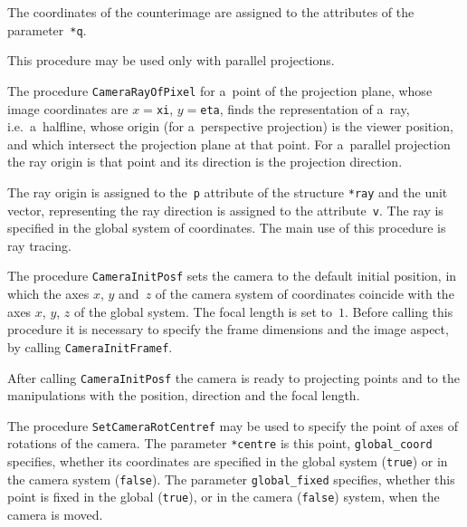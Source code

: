 The coordinates of the counterimage are assigned to the attributes of the
parameter~\texttt{*q}.

This procedure may be used only with parallel projections.

\vspace{\bigskipamount}
\begin{sloppypar}
The procedure \texttt{CameraRayOfPixel} for a~point of the projection plane,
whose image coordinates are $x={}$\texttt{xi}, $y={}$\texttt{eta}, finds
the representation of a~ray, i.e.\ a~halfline, whose origin (for
a~perspective projection) is the viewer position, and which intersect the
projection plane at that point. For a~parallel projection the ray origin is
that point and its direction is the projection direction.%
\end{sloppypar}

\begin{sloppypar}
The ray origin is assigned to the~\texttt{p} attribute of the structure
\texttt{*ray} and the unit vector, representing the ray direction is
assigned to the attribute~\texttt{v}. The ray is specified in the global
system of coordinates. The main use of this procedure is ray tracing.%
\end{sloppypar}

\vspace{\bigskipamount}
The procedure \texttt{CameraInitPosf} sets the camera to the default initial
position, in which the axes $x$, $y$ and~$z$ of the camera system of
coordinates coincide with the axes $x$, $y$, $z$ of the global system. The
focal length is set to~$1$. Before calling this procedure it is necessary to
specify the frame dimensions and the image aspect, by calling
\texttt{CameraInitFramef}.

After calling \texttt{CameraInitPosf} the camera is ready to projecting
points and to the manipulations with the position, direction and the focal
length.

\vspace{\bigskipamount}
The procedure \texttt{SetCameraRotCentref} may be used to specify
the point of axes of rotations of the camera. The parameter
\texttt{*centre} is this point, \texttt{global\_coord}
specifies, whether its coordinates are specified in the global system
(\texttt{true}) or in the camera system (\texttt{false}).
The parameter \texttt{global\_fixed} specifies, whether this point
is fixed in the global (\texttt{true}), or in the camera (\texttt{false})
system, when the camera is moved.

